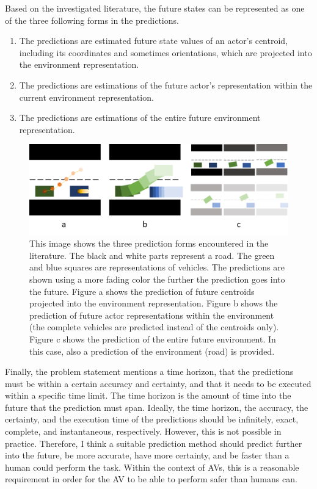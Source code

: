 Based on the investigated literature, the future states can be represented as one of the three following forms in the predictions. 

\begin{enumerate}
	\item The predictions are estimated future state values of an actor's centroid, including its coordinates and sometimes orientations, which are projected into the environment representation.
	\item The predictions are estimations of the future actor's representation within the current environment representation.
	\item The predictions are estimations of the entire future environment representation.
\end{enumerate}

\begin{figure}[h!]
	\centering
	\includegraphics[width=0.8\linewidth]{Figures/Introduction/Prediction_forms}
	\caption{This image shows the three prediction forms encountered in the literature. The black and white parts represent a road. The green and blue squares are representations of vehicles. The predictions are shown using a more fading color the further the prediction goes into the future. Figure a shows the prediction of future centroids projected into the environment representation. Figure b shows the prediction of future actor representations within the environment (the complete vehicles are predicted instead of the centroids only). Figure c shows the prediction of the entire future environment. In this case, also a prediction of the environment (road) is provided.}  
	\label{fig:pred_froms}
\end{figure}

Finally, the problem statement mentions a time horizon, that the predictions must be within a certain accuracy and certainty, and that it needs to be executed within a specific time limit. The time horizon is the amount of time into the future that the prediction must span. Ideally, the time horizon, the accuracy, the certainty, and the execution time of the predictions should be infinitely, exact, complete, and instantaneous, respectively. However, this is not possible in practice. Therefore, I think a suitable prediction method should predict further into the future, be more accurate, have more certainty, and be faster than a human could perform the task. Within the context of \glspl{AV}, this is a reasonable requirement in order for the \gls{AV} to be able to perform safer than humans can.   


